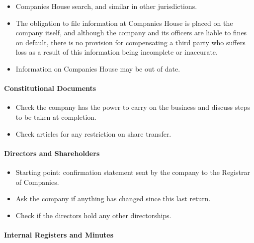 \documentclass[
]{article}
\providecommand{\tightlist}{%
  \setlength{\itemsep}{0pt}\setlength{\parskip}{0pt}}
\begin{document}
\begin{itemize}
\tightlist
\item
  Companies House search, and similar in other jurisdictions.
\item
  The obligation to file information at Companies House is placed on the
  company itself, and although the company and its officers are liable
  to fines on default, there is no provision for compensating a third
  party who suffers loss as a result of this information being
  incomplete or inaccurate.
\item
  Information on Companies House may be out of date.
\end{itemize}

\hypertarget{constitutional-documents}{%
\paragraph{Constitutional Documents}\label{constitutional-documents}}

\begin{itemize}
\tightlist
\item
  Check the company has the power to carry on the business and discuss
  steps to be taken at completion.
\item
  Check articles for any restriction on share transfer.
\end{itemize}

\hypertarget{directors-and-shareholders}{%
\paragraph{Directors and
Shareholders}\label{directors-and-shareholders}}

\begin{itemize}
\tightlist
\item
  Starting point: confirmation statement sent by the company to the
  Registrar of Companies.
\item
  Ask the company if anything has changed since this last return.
\item
  Check if the directors hold any other directorships.
\end{itemize}

\hypertarget{internal-registers-and-minutes}{%
\paragraph{Internal Registers and
Minutes}\label{internal-registers-and-minutes}}
\end{document}
